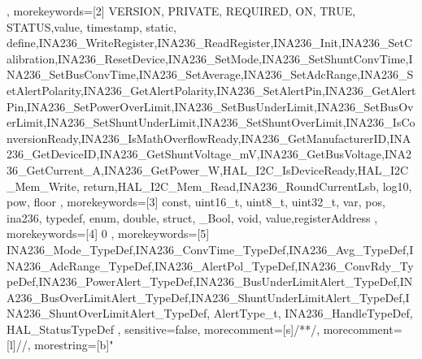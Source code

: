 {{	},
	morekeywords=[2]{
		VERSION, PRIVATE, REQUIRED, ON, TRUE, STATUS,value, timestamp, static, define,INA236_WriteRegister,INA236_ReadRegister,INA236_Init,INA236_SetCalibration,INA236_ResetDevice,INA236_SetMode,INA236_SetShuntConvTime,INA236_SetBusConvTime,INA236_SetAverage,INA236_SetAdcRange,INA236_SetAlertPolarity,INA236_GetAlertPolarity,INA236_SetAlertPin,INA236_GetAlertPin,INA236_SetPowerOverLimit,INA236_SetBusUnderLimit,INA236_SetBusOverLimit,INA236_SetShuntUnderLimit,INA236_SetShuntOverLimit,INA236_IsConversionReady,INA236_IsMathOverflowReady,INA236_GetManufacturerID,INA236_GetDeviceID,INA236_GetShuntVoltage_mV,INA236_GetBusVoltage,INA236_GetCurrent_A,INA236_GetPower_W,HAL_I2C_IsDeviceReady,HAL_I2C_Mem_Write, return,HAL_I2C_Mem_Read,INA236_RoundCurrentLsb, log10, pow, floor
	},
	morekeywords=[3]{ 
		const, uint16_t, uint8_t, uint32_t, var, pos, ina236, typedef, enum, double, struct, _Bool, void, value,registerAddress
	},
	morekeywords=[4]{ 
		0
	},
	morekeywords=[5]{
		INA236_Mode_TypeDef,INA236_ConvTime_TypeDef,INA236_Avg_TypeDef,INA236_AdcRange_TypeDef,INA236_AlertPol_TypeDef,INA236_ConvRdy_TypeDef,INA236_PowerAlert_TypeDef,INA236_BusUnderLimitAlert_TypeDef,INA236_BusOverLimitAlert_TypeDef,INA236_ShuntUnderLimitAlert_TypeDef,INA236_ShuntOverLimitAlert_TypeDef, AlertType_t, INA236_HandleTypeDef, HAL_StatusTypeDef
	},
	sensitive=false,
	morecomment=[s]{/*}{*/},
	morecomment=[l]{//},
	morestring=[b]"
}


\newcommand\numberstyle[1]{%
	\footnotesize
	\color{codegray}%
	\ttfamily
	\ifnum#1<10 0\fi#1 |%
}
